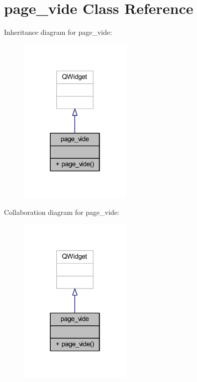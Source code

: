 \hypertarget{classpage__vide}{}\section{page\+\_\+vide Class Reference}
\label{classpage__vide}


Inheritance diagram for page\+\_\+vide\+:
\nopagebreak
\begin{figure}[H]
\begin{center}
\leavevmode
\includegraphics[width=154pt]{classpage__vide__inherit__graph}
\end{center}
\end{figure}


Collaboration diagram for page\+\_\+vide\+:
\nopagebreak
\begin{figure}[H]
\begin{center}
\leavevmode
\includegraphics[width=154pt]{classpage__vide__coll__graph}
\end{center}
\end{figure}


